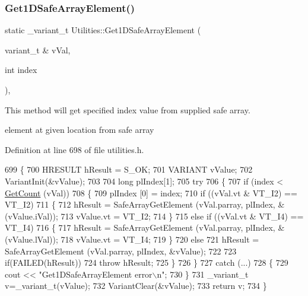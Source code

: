 \subsubsection{\texorpdfstring{Get1\+D\+Safe\+Array\+Element()}{Get1DSafeArrayElement()}}
{\footnotesize\ttfamily static \+\_\+variant\+\_\+t Utilities\+::\+Get1\+D\+Safe\+Array\+Element (\begin{DoxyParamCaption}\item[{variant\+\_\+t \&}]{v\+Val,  }\item[{int}]{index }\end{DoxyParamCaption})\hspace{0.3cm}{\ttfamily [inline]}, {\ttfamily [static]}}

This method will get specified index value from supplied safe array.

element at given location from safe array 

Definition at line 698 of file utilities.\+h.


\begin{DoxyCode}
699     \{
700         HRESULT hResult = S\_OK;
701         VARIANT vValue;
702         VariantInit(&vValue);
703 
704         \textcolor{keywordtype}{long} plIndex[1];
705         \textcolor{keywordflow}{try}
706         \{
707             \textcolor{keywordflow}{if} (index < \hyperlink{class_utilities_a90940686ffd15fdebcd9ed4751e0048e_a90940686ffd15fdebcd9ed4751e0048e}{GetCount} (vVal))
708             \{
709                 plIndex [0] = index;
710                 \textcolor{keywordflow}{if} ((vVal.vt & VT\_I2) == VT\_I2)
711                 \{
712                     hResult = SafeArrayGetElement (vVal.parray, plIndex, &(vValue.iVal));
713                     vValue.vt = VT\_I2;
714                 \}
715                 \textcolor{keywordflow}{else} \textcolor{keywordflow}{if} ((vVal.vt & VT\_I4) == VT\_I4)
716                 \{
717                     hResult = SafeArrayGetElement (vVal.parray, plIndex, &(vValue.lVal));
718                     vValue.vt = VT\_I4;
719                 \}
720                 \textcolor{keywordflow}{else}
721                     hResult = SafeArrayGetElement (vVal.parray, plIndex, &vValue);
722 
723                 \textcolor{keywordflow}{if}(FAILED(hResult))
724                     \textcolor{keywordflow}{throw} hResult;
725             \}
726         \}
727         \textcolor{keywordflow}{catch} (...)
728         \{
729             cout << \textcolor{stringliteral}{"Get1DSafeArrayElement error\(\backslash\)n"};
730         \}
731         \_variant\_t v=\_variant\_t(vValue);
732         VariantClear(&vValue);
733         \textcolor{keywordflow}{return} v;
734     \}
\end{DoxyCode}
\mbox{\label{class_utilities_a90940686ffd15fdebcd9ed4751e0048e_a90940686ffd15fdebcd9ed4751e0048e}} 
